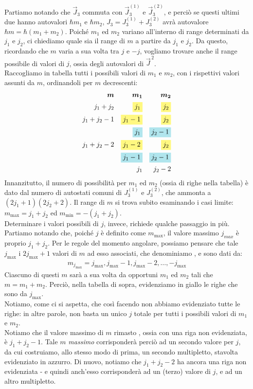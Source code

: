 \documentclass[../../FisicaTeorica.tex]{subfiles}
\begin{document}
Partiamo notando che $\vec{J}_3$ commuta con $\vec{J}^{(1)}_3$ e $\vec{J}^{(2)}_3$, e perciò se questi ultimi due hanno autovalori $\hbar m_1$ e $\hbar m_2$, $J_3 = J_3^{(1)} + J_3^{(2)}$ avrà autovalore $\hbar m = \hbar(m_1+m_2)$. Poiché $m_1$ ed $m_2$ variano all'interno di range determinati da $j_1$ e $j_2$, ci chiediamo quale sia il range di $m$ a partire da $j_1$ e $j_2$. Da questo, ricordando che $m$ varia a sua volta tra $j$ e $-j$, vogliamo trovare anche il range possibile di valori di $j$, ossia degli autovalori di $\vec{J}^{\,2}$.\\

Raccogliamo in tabella tutti i possibili valori di $m_1$ e $m_2$, con i rispettivi valori assunti da $m$, ordinandoli per $m$ decrescenti:
\begin{align*}
\bm{m} && \bm{m_1} && \bm{m_2}\\
j_1 + j_2 && \hlc{Yellow}{j_1} && \hlc{Yellow}{j_2}\\
j_1 + j_2-1 && \hlc{Yellow}{j_1-1} && \hlc{Yellow}{j_2}\\
 && \hlc{SkyBlue}{j_1} && \hlc{SkyBlue}{j_2-1}\\
 j_1+j_2-2 && \hlc{Yellow}{j_1 -2} && \hlc{Yellow}{j_2} \\
  && \hlc{SkyBlue}{j_1-1} && \hlc{SkyBlue}{j_2 -1}\\
  && j_1 && j_2 -2
\end{align*}
Innanzitutto, il numero di possibilità per $m_1$ ed $m_2$ (ossia di righe nella tabella) è dato dal numero di autostati comuni di $J_3^{(1)}$ e $J_3^{(2)}$, che ammonta a \hbox{$(2j_1 +1)(2j_2 +2)$}. Il range di $m$ si trova subito esaminando i casi limite: \hbox{$m_{\max}=j_1+j_2$} ed \hbox{$m_{\min}=-(j_1+j_2)$}.\\
Determinare i valori possibili di $j$, invece, richiede qualche passaggio in più. Partiamo notando che, poiché $j$ è definito come $m_{\max}$, il valore massimo $j_{max}$ è proprio $j_1+j_2$. Per le regole del momento angolare, possiamo pensare che tale $j_{\max}$  i $2j_{\max}+1$ valori di $m$ ad esso associati, che denominiamo , e sono dati da:
\begin{align*}
m_{j_{\max}}= j_{\max}, j_{\max}-1, j_{\max} -2, \dots, -j_{\max}
\end{align*}
Ciascuno di questi $m$ sarà a sua volta  da opportuni $m_1$ ed $m_2$ tali che $m=m_1+m_2$. Perciò, nella tabella di sopra, evidenziamo in giallo le righe che sono  da $j_{\max}$.\\
Notiamo, come ci si aspetta, che così facendo non abbiamo evidenziato tutte le righe: in altre parole, non basta un unico $j$ totale per  tutti i possibili valori di $m_1$ e $m_2$.\\
Notiamo che il valore massimo di $m$ rimasto , ossia con una riga non evidenziata, è $j_1+j_2-1$. Tale $m$ \textit{massimo} corrisponderà perciò ad un secondo valore per $j$, da cui costruiamo, allo stesso modo di prima, un secondo multipletto, stavolta evidenziato in azzurro. Di nuovo, notiamo che $j_1 + j_2 -2$ ha ancora una riga non evidenziata - e quindi anch'esso corrisponderà ad un (terzo) valore di $j$, e ad un altro multipletto.\\
\end{document}
